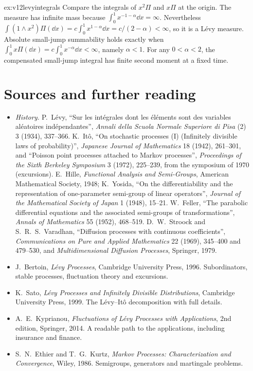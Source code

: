 \begin{solution}{ex:v12levyintegrals}
\idea Compare the integrals of $x^2\Pi$ and $x\Pi$ at the origin.
\writeup The measure has infinite mass because $\int_0^1x^{-1-\alpha}\dd x=\infty$. Nevertheless $\int(1\wedge x^2)\Pi(\dd x)=c\int_0^1x^{1-\alpha}\dd x=c/(2-\alpha)<\infty$, so it is a Lévy measure. Absolute small-jump summability holds exactly when $\int_0^1x\Pi(\dd x)=c\int_0^1x^{-\alpha}\dd x<\infty$, namely $\alpha<1$. For any $0<\alpha<2$, the compensated small-jump integral has finite second moment at a fixed time.
\end{solution}

\section*{Sources and further reading}

\begin{itemize}
\item \emph{History.} P.~L\'evy, ``Sur les int\'egrales dont les \'el\'ements sont des variables al\'eatoires ind\'ependantes'', \emph{Annali della Scuola Normale Superiore di Pisa} (2) 3 (1934), 337--366. K.~It\^o, ``On stochastic
processes (I) (Infinitely divisible laws of probability)'', \emph{Japanese Journal of Mathematics} 18 (1942), 261--301, and ``Poisson point processes attached to Markov processes'', \emph{Proceedings of the Sixth Berkeley
Symposium} 3 (1972), 225--239, from the symposium of 1970 (excursions). E.~Hille, \emph{Functional Analysis and Semi-Groups}, American Mathematical Society, 1948; K.~Yosida,
``On the differentiability and the representation of one-parameter semi-group of linear operators'', \emph{Journal of the Mathematical Society of Japan} 1 (1948), 15--21. W.~Feller, ``The parabolic differential equations
and the associated semi-groups of transformations'', \emph{Annals of Mathematics} 55 (1952), 468--519. D.~W.~Stroock and S.~R.~S.~Varadhan, ``Diffusion processes with continuous coefficients'', \emph{Communications on Pure
and Applied Mathematics} 22 (1969), 345--400 and 479--530, and \emph{Multidimensional Diffusion Processes}, Springer, 1979.
\item J.~Bertoin, \emph{L\'evy Processes}, Cambridge University Press, 1996. Subordinators, stable processes, fluctuation theory and excursions.
\item K.~Sato, \emph{L\'evy Processes and Infinitely Divisible Distributions}, Cambridge University Press, 1999. The L\'evy--It\^o decomposition with full details.
\item A.~E.~Kyprianou, \emph{Fluctuations of L\'evy Processes with Applications}, 2nd edition, Springer, 2014. A readable path to the applications, including insurance and finance.
\item S.~N.~Ethier and T.~G.~Kurtz, \emph{Markov Processes: Characterization and Convergence}, Wiley, 1986. Semigroups, generators and martingale problems.
\end{itemize}
